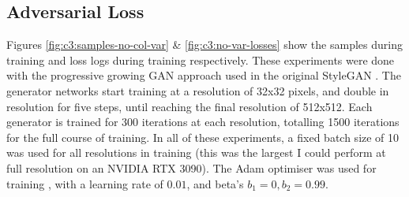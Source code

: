 \subsection{Adversarial Loss}

\label{c3:sec:adv-loss}

Figures \ref{fig:c3:samples-no-col-var} \& \ref{fig:c3:no-var-losses} show the samples during training and loss logs during training respectively.
These experiments were done with the progressive growing GAN approach \citep{karras2017progressive} used in the original StyleGAN \citep{karras2019style}.
The generator networks start training at a resolution of 32x32 pixels, and double in resolution for five steps, until reaching the final resolution of 512x512. 
Each generator is trained for 300 iterations at each resolution, totalling 1500 iterations for the full course of training.
In all of these experiments, a fixed batch size of 10 was used for all resolutions in training (this was the largest I could perform at full resolution on an NVIDIA RTX 3090). 
The Adam optimiser was used for training \citep{kingma2014adam}, with a learning rate of $0.01$, and beta's $b_{1} = 0, b_{2} = 0.99$.



